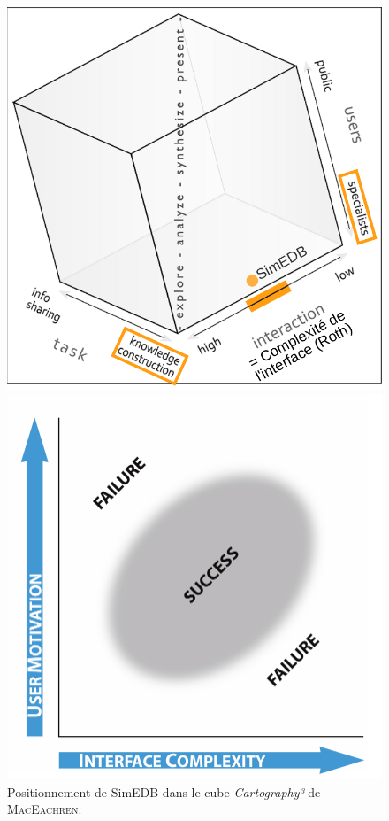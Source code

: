 \begin{figure}[H]
\hspace*{\fill}%
\begin{minipage}[t]{.46\linewidth}
\centering
\captionsetup{width=.9\linewidth}
\vspace{0pt}
\includegraphics[width=\linewidth]{img/Cartography3_SimEDB.pdf}
\caption{Positionnement de SimEDB dans le cube \textit{Cartography³} de \textsc{MacEachren}.}
\label{fig:cartography3-simedb}
\end{minipage} \hfill
\begin{minipage}[t]{.46\linewidth}
\centering
\captionsetup{width=.9\linewidth}
\vspace{0pt}
\includegraphics[width=\linewidth]{img/Roth_Interface_Complexity.png}

\end{minipage}
\end{figure}
